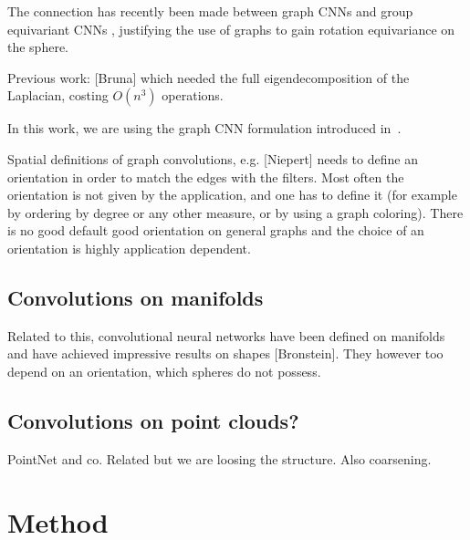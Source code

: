 \documentclass[final,twocolumn,3p,times,authoryear]{elsarticle}
\newcommand{\nati}[1]{{\color[rgb]{.1,.6,.1}{#1}}}
\newcommand{\todo}[1]{{\color[rgb]{.6,.1,.6}{#1}}}
\newcommand{\assign}[1]{{\color[rgb]{.8,.5,.8}{Assigned: #1 }}}
\newcommand{\1}{\b{1}}              %
\newcommand{\0}{\b{0}}              %
\begin{document}
\nati{I think that citing Bruna is to much... According to me, the goal of this subsection should not be to cite everything that exist. But should focus on
1) be fair and say that they are other graph convolutions that can be used, 2) show some connections between graph CNNs ang group equivariant CNNs (Done), and 3) suggest that they are possible extensions of what we do.}

\assign{Michaël}

\todo{other approaches? GNNs, Kipf first order approx, message passing}

The connection has recently been made between graph CNNs and group equivariant CNNs \cite{kondor2018equivariance}, justifying the use of graphs to gain rotation equivariance on the sphere.

Previous work: [Bruna] which needed the full eigendecomposition of the Laplacian, costing $O(n^3)$ operations.

In this work, we are using the graph CNN formulation introduced in~\cite{defferrard2016convolutional}.

Spatial definitions of graph convolutions, e.g. [Niepert] needs to define an orientation in order to match the edges with the filters. Most often the orientation is not given by the application, and one has to define it (for example by ordering by degree or any other measure, or by using a graph coloring). There is no good default good orientation on general graphs and the choice of an orientation is highly application dependent.



\subsection{Convolutions on manifolds}


Related to this, convolutional neural networks have been defined on manifolds and have achieved impressive results on shapes [Bronstein]. They however too depend on an orientation, which spheres do not possess.

\subsection{Convolutions on point clouds?}


PointNet and co. Related but we are loosing the structure. Also coarsening.

\section{Method}
\label{sec:method}
\end{document}
